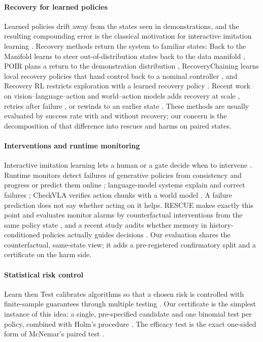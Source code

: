 \documentclass[preprint,12pt]{elsarticle}
\begin{document}
\paragraph{Recovery for learned policies}
Learned policies drift away from the states seen in demonstrations, and the resulting compounding error is the classical motivation for interactive imitation learning \cite{ross2011dagger,laskey2017dart}. Recovery methods return the system to familiar states: Back to the Manifold learns to steer out-of-distribution states back to the data manifold \cite{reichlin2022manifold}, POIR plans a return to the demonstration distribution \cite{cideron2023getback}, RecoveryChaining learns local recovery policies that hand control back to a nominal controller \cite{vats2025recoverychaining}, and Recovery RL restricts exploration with a learned recovery policy \cite{thananjeyan2021recoveryrl}. Recent work on vision--language--action and world--action models adds recovery at scale \cite{liufu2026repovla,li2026causalhistory}, retries after failure \cite{du2024toerr}, or rewinds to an earlier state \cite{zheng2026rewind}. These methods are usually evaluated by success rate with and without recovery; our concern is the decomposition of that difference into rescues and harms on paired states.

\paragraph{Interventions and runtime monitoring}
Interactive imitation learning lets a human or a gate decide when to intervene \cite{kelly2019hgdagger,hoque2022thrifty}. Runtime monitors detect failures of generative policies from consistency and progress \cite{agia2025unpacking} or predict them online \cite{romer2025fiper}; language-model systems explain and correct failures \cite{liu2023reflect,duan2025aha}; CheckVLA verifies action chunks with a world model \cite{liu2026checkvla}. A failure prediction does not say whether acting on it helps. RESCUE makes exactly this point and evaluates monitor alarms by counterfactual interventions from the same policy state \cite{ahmedt2026rescue}, and a recent study audits whether memory in history-conditioned policies actually guides decisions \cite{zhang2026memory}. Our evaluation shares the counterfactual, same-state view; it adds a pre-registered confirmatory split and a certificate on the harm side.

\paragraph{Statistical risk control}
Learn then Test calibrates algorithms so that a chosen risk is controlled with finite-sample guarantees through multiple testing \cite{angelopoulos2021ltt}. Our certificate is the simplest instance of this idea: a single, pre-specified candidate and one binomial test per policy, combined with Holm's procedure \cite{holm1979}. The efficacy test is the exact one-sided form of McNemar's paired test \cite{mcnemar1947}.
\end{document}
